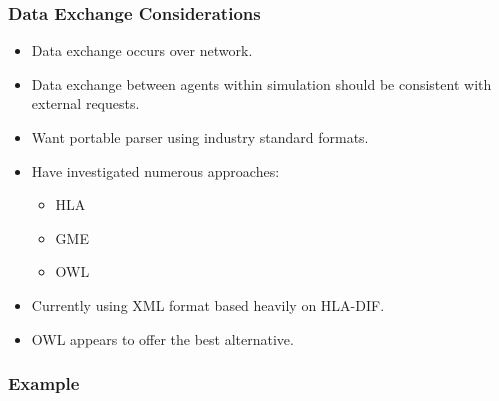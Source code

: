 \documentclass{beamer}
\begin{document}
\begin{frame}
  \frametitle{Data Exchange Considerations}

  \begin{itemize}
  \item Data exchange occurs over network.
  \item Data exchange between agents within simulation should be
    consistent with external requests.
  \item Want portable parser using industry standard formats.
  \item Have investigated numerous approaches:
    \begin{itemize}
    \item HLA
    \item GME
    \item OWL
    \end{itemize}
  \item Currently using XML format based heavily on HLA-DIF.
  \item OWL appears to offer the best alternative.
  \end{itemize}
  

\end{frame}




%
%
%
%



%    
%  
%
%
%


\begin{frame}
  \frametitle{Example}
  
\end{frame}
\end{document}
